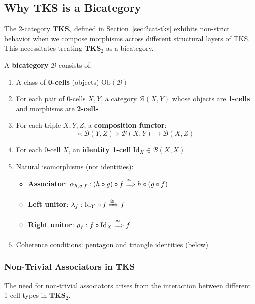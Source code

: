 \subsection{Why TKS is a Bicategory}

The 2-category $\mathbf{TKS}_2$ defined in Section~\ref{sec:2cat-tks} exhibits
non-strict behavior when we compose morphisms across different structural layers
of TKS. This necessitates treating $\mathbf{TKS}_2$ as a bicategory.

\begin{definition}[Bicategory]
\label{def:bicategory}
A \textbf{bicategory} $\mathcal{B}$ consists of:
\begin{enumerate}[label=(\roman*)]
  \item A class of \textbf{0-cells} (objects) $\mathrm{Ob}(\mathcal{B})$
  \item For each pair of 0-cells $X, Y$, a category $\mathcal{B}(X, Y)$ whose objects
        are \textbf{1-cells} and morphisms are \textbf{2-cells}
  \item For each triple $X, Y, Z$, a \textbf{composition functor}:
        \[
          \circ : \mathcal{B}(Y, Z) \times \mathcal{B}(X, Y) \to \mathcal{B}(X, Z)
        \]
  \item For each 0-cell $X$, an \textbf{identity 1-cell} $\mathrm{Id}_X \in \mathcal{B}(X, X)$
  \item Natural isomorphisms (not identities):
        \begin{itemize}
          \item \textbf{Associator}: $\alpha_{h,g,f} : (h \circ g) \circ f \xRightarrow{\cong} h \circ (g \circ f)$
          \item \textbf{Left unitor}: $\lambda_f : \mathrm{Id}_Y \circ f \xRightarrow{\cong} f$
          \item \textbf{Right unitor}: $\rho_f : f \circ \mathrm{Id}_X \xRightarrow{\cong} f$
        \end{itemize}
  \item Coherence conditions: pentagon and triangle identities (below)
\end{enumerate}
\end{definition}

\subsubsection{Non-Trivial Associators in TKS}

The need for non-trivial associators arises from the interaction between different
1-cell types in $\mathbf{TKS}_2$.

